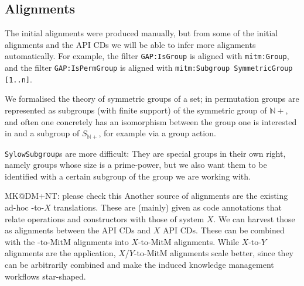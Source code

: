 \subsection{Alignments}

The initial alignments were produced manually, but from some of the initial alignments
and the \GAP API CDs we will be able to infer more alignments automatically.  For example,
the filter \texttt{GAP:IsGroup} is aligned with
\texttt{mitm:Group}, and the filter \texttt{GAP:IsPermGroup} is aligned with
\texttt{mitm:Subgroup SymmetricGroup [1..n]}.  

We formalised the theory of symmetric groups of a set; in \GAP permutation groups
are represented as subgroups (with finite support) of the symmetric group of
$\mathbb{N}+$, and often one concretely has an isomorphism between the group one
is interested in and a subgroup of $S_{\mathbb{N}+}$, for example
via a group action.

\texttt{SylowSubgroup}s are more difficult: They are special groups in their
own right, namely groups whose size is a prime-power, but we also want them
to be identified with a certain subgroup of the group we are working
with.

\begin{newpart}{MK@DM+NT: please check this }
  Another source of alignments are the existing ad-hoc \Sage-to-$X$ translations. These
  are (mainly) given as \Sage code annotations that relate \Sage operations and
  constructors with those of system $X$. We can harvest those as alignments between
  the \Sage API CDs and $X$ API CDs. These can be combined with the \Sage-to-MitM
  alignments into $X$-to-MitM alignments. While $X$-to-$Y$ alignments are the application,
  $X$/$Y$-to-MitM alignments scale better, since they can be arbitrarily combined and make
  the induced knowledge management workflows star-shaped.
\end{newpart}



